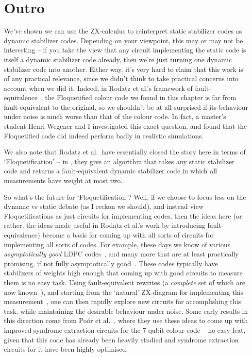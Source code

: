 \section{Outro}

We've shown we can use the ZX-calculus to reinterpret static stabilizer codes as dynamic stabilizer codes.
Depending on your viewpoint, this may or may not be interesting -- if you take the view that any circuit implementing the static code is itself a dynamic stabilizer code already, then we're just turning one dynamic stabilizer code into another.
Either way, it's very hard to claim that this work is of any practical relevance, since we didn't think to take practical concerns into account when we did it.
Indeed, in Rodatz et al.'s framework of fault-equivalence~\cite{rodatz2024floquetifying}, the Floquetified colour code we found in this chapter is far from fault-equivalent to the original, so we shouldn't be at all surprised if its behaviour under noise is much worse than that of the colour code.
In fact, a master's student Henri Wegener and I investigated this exact question, and found that the Floquetified code did indeed perform badly in realistic simulations.

We also note that Rodatz et al.\ have essentially closed the story here in terms of `Floquetification' -- in , they give an algorithm that takes any static stabilizer code and returns a fault-equivalent dynamic stabilizer code in which all measurements have weight at most two.

So what's the future for `Floquetification'?
Well, if we choose to focus less on the dynamic vs static debate (as I reckon we should), and instead view Floquetifications as just circuits for implementing codes, then the ideas here (or rather, the ideas made useful in Rodatz et al.'s work by introducing fault-equivalence) become a basis for coming up with all sorts of circuits for implementing all sorts of codes.
For example, these days we know of various \textit{asymptotically good} LDPC codes~\cite{panteleev2022asymptoticallygoodquantumlocally,Breuckmann_2021,leverrier2022quantumtannercodes}, and many more that are at least practically promising, if not fully asymptotically good~\cite{yoder2025tourgrossmodularquantum}.
These codes typically have stabilizers of weights high enough that coming up with good circuits to measure them is no easy task.
Using fault-equivalent rewrites (a \textit{complete} set of which are now known~\cite{rüsch2025completenessfaultequivalenceclifford}), and starting from the `natural' ZX-diagram for implementing this measurement~\cite[Proposition 6.7]{rodatz2025faulttoleranceconstruction}, one can then rapidly explore new circuits for accomplishing this task, while maintaining the desirable behaviour under noise.
Some early results in this direction come from Poór et al.~\cite{poór2025ultralowoverheadsyndrome}, where they use these ideas to come up with improved syndrome extraction circuits for the 7-qubit colour code -- no easy feat, given that this code has already been heavily studied and syndrome extraction circuits for it have been highly optimised.

